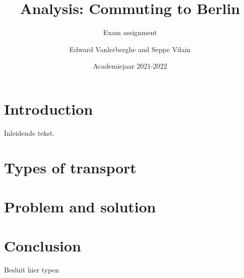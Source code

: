 \documentclass[a4paper,twoside,kul]{kulakreport} %
\title{Analysis: Commuting to Berlin}
\subtitle{Exam assignment}
\author{Edward Vanlerberghe and Seppe Vilain}
\institute{KU Leuven}
\date{Academiejaar 2021-2022}
\begin{document}

\titlepage
\tableofcontents

\clearpage
\chapter*{Introduction}
Inleidende tekst.

\clearpage
\chapter{Types of transport}

	
\clearpage
\chapter{Problem and solution}


\chapter*{Conclusion}
Besluit hier typen

\clearpage

\nocite{dlr76743}


\end{document}
